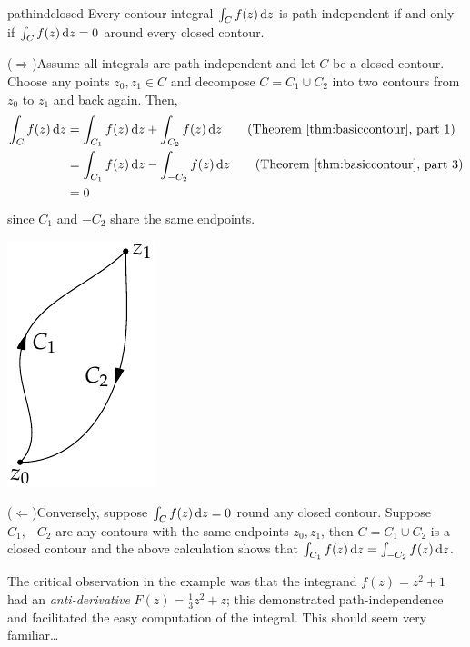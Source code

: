 \begin{lemm}{}{pathindclosed}
Every contour integral $\int_Cf(z)\,{\mathrm{d} z}$ is path-independent if and only if $\int_Cf(z)\,{\mathrm{d} z}=0$ around every closed contour.
\end{lemm}


\begin{tcolorbox}[proofstyle]
\begin{minipage}[t]{0.8\linewidth}\vspace{0pt}
($\Rightarrow$)\quad Assume all integrals are path independent and let $C$ be a closed contour. Choose any points $z_0,z_1\in C$ and decompose $C=C_1\cup C_2$ into two contours from $z_0$ to $z_1$ and back again. Then,
\begin{align*}
\int_Cf(z)\,\dz&=\int_{C_1}f(z)\,\dz+\int_{C_2}f(z)\,\dz \tag{Theorem \ref{thm:basiccontour}, part 1}\\
&=\int_{C_1}f(z)\,\dz-\int_{-C_2}f(z)\,\dz \tag{Theorem \ref{thm:basiccontour}, part 3}\\
&=0
\end{align*}
since $C_1$ and $-C_2$ share the same endpoints.
\end{minipage}\begin{minipage}[t]{0.2\linewidth}\vspace{0pt}
\flushright\includegraphics{ftc-1}
\end{minipage}\smallbreak

($\Leftarrow$)\quad Conversely, suppose $\int_Cf(z)\,{\mathrm{d} z}=0$ round any closed contour. Suppose $C_1,-C_2$ are any contours with the same endpoints $z_0,z_1$, then $C=C_1\cup C_2$ is a closed contour and the above calculation shows that $\int_{C_1}f(z)\,{\mathrm{d} z}=\int_{-C_2}f(z)\,{\mathrm{d} z}$.\hfill\qedsymbol
\end{tcolorbox}

The critical observation in the example was that the integrand $f(z)=z^2+1$ had an \emph{anti-derivative} $F(z)=\frac 13z^2+z$; this demonstrated path-independence and facilitated the easy computation of the integral. This should seem very familiar\ldots 

